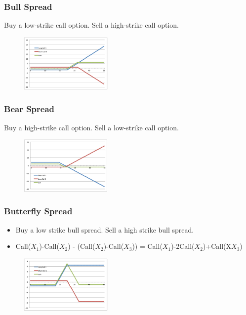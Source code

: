 \begin{multicols}{2}
\subsubsection{Bull Spread}
Buy a low-strike call option. Sell a high-strike call option.
\begin{figure}[H]
    \centering 
    \includegraphics[width =0.4\textwidth]{Figure/bull.png}
\end{figure}

\subsubsection{Bear Spread}
Buy a high-strike call option. Sell a low-strike call option.
\begin{figure}[H]
    \centering 
    \includegraphics[width =0.4\textwidth]{Figure/bear.png}
\end{figure}

\subsubsection{Butterfly Spread}
\begin{itemize}
    \item Buy a low strike bull spread. Sell a high strike bull spread.
    \item Call($X_1$)-Call($X_2$) - (Call($X_2$)-Call($X_3$)) = Call($X_1$)-2Call($X_2$)+Call(X$X_3$)
\end{itemize}
\begin{figure}[H]
    \centering 
    \includegraphics[width =0.4\textwidth]{Figure/butter.png}
\end{figure}


\end{multicols}
